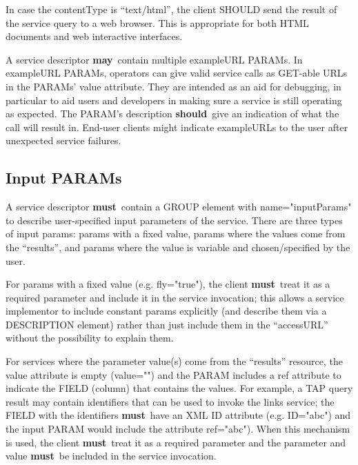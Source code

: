 \documentclass[11pt,a4paper]{ivoa}
\newcommand{\attval}[2]{#1={\allowbreak}{"}#2{"}}
\newcommand{\rfcmust}{\textbf{must}}
\newcommand{\rfcshould}{\textbf{should}}
\newcommand{\rfcmay}{\textbf{may}}
\begin{document}
In case the contentType is ``text/html'', the client SHOULD send the result 
of the service query to a web browser.  This is appropriate for both HTML
documents and web interactive interfaces. 
 
A service descriptor \rfcmay\ contain multiple exampleURL PARAMs.
In exampleURL PARAMs, operators can give valid service calls as GET-able
URLs in the PARAMs' value attribute. They are intended as an aid for
debugging, in particular to aid users and developers in making sure a
service is still operating as expected. The PARAM's description \rfcshould\
give an indication of what the call will result in. End-user clients
might indicate exampleURLs to the user after unexpected service failures.

\subsection{Input PARAMs}

A service descriptor \rfcmust\ contain a GROUP element with \attval{name}{inputParams} 
to describe user-specified input parameters of the service. There are three types of 
input params: params with a fixed value, params where the values come from the 
``results'', and params where the value is variable and chosen/specified by the user.

For params with a fixed value (e.g. \attval{fly}{true}), the client \rfcmust\
treat it as a required parameter and include it in the service invocation; this allows
a service implementor to include constant params explicitly (and describe them via a 
DESCRIPTION element) rather than just include them in the ``accessURL'' without the
possibility to explain them.

For services where the parameter value(s) come from the ``results'' resource, the value 
attribute is empty (\attval{value}{}) and the PARAM includes a ref attribute to indicate 
the FIELD (column) that contains the values. For example, a TAP query result may contain 
identifiers that can be used to invoke the {links} service; the FIELD with the identifiers 
\rfcmust\ have an XML ID attribute (e.g. \attval{ID}{abc}) and the input PARAM would include 
the attribute \attval{ref}{abc}). When this mechanism is used, the client \rfcmust\
treat it as a required parameter and the parameter and value \rfcmust\ be included in 
the service invocation.
\end{document}
